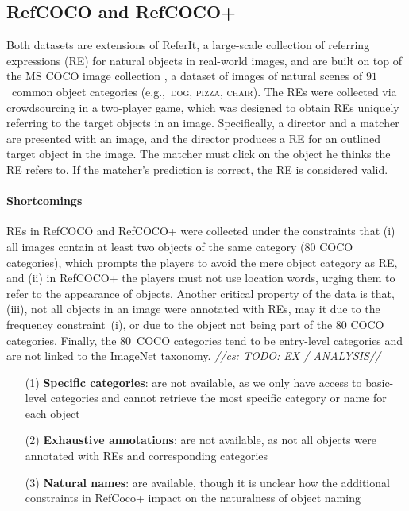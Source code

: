 \documentclass[runningheads]{llncs}
\newcommand{\cs}[1]{\textcolor{PineGreen}{\emph{//cs: #1//}}}
\newcommand{\referit}{ReferIt\xspace}
\newcommand{\refcoco}{RefCOCO\xspace}
\newcommand{\refcocop}{RefCOCO+\xspace}
\newcommand{\cat}[1]{\textsc{#1}}
\begin{document}

\subsection{\refcoco and \refcocop \cite{Yu2016}}
Both datasets are extensions of \referit\cite{Kazemzadeh2014}, a large-scale collection of referring expressions (RE) for natural objects in real-world images, and are built on top of the MS COCO image collection \cite{mscoco}, 
a dataset of images of natural scenes of $91$~common object categories (e.g.,~\cat{dog, pizza, chair}). 
The REs were collected via crowdsourcing in a two-player game, which was designed to obtain REs uniquely referring to the target objects in an image. 
Specifically, a director and a matcher are presented with an image, and the director produces a RE for an outlined target object in the image. 
The matcher must click on the object he thinks the RE refers to. %
If the matcher's prediction is correct, the RE is considered valid.


\paragraph{Shortcomings}
REs in \refcoco and \refcocop were collected under the constraints that (i) all images contain at least two objects of the same category (80 COCO categories), which prompts the players to avoid the mere object category as RE, and (ii) in \refcocop the players must not use location words, urging them to refer to the appearance of objects. 
Another critical property of the data is that, (iii), not all objects in an image were annotated with REs, may it due to the frequency constraint~(i), or due to the object not being part of the 80 COCO categories. 
Finally, the $80$~COCO categories tend to be entry-level categories and are not linked to the ImageNet taxonomy. \cs{TODO: EX / ANALYSIS}

\begin{itemize}
     		\item[(1)] \textbf{Specific categories}: are not available, as we only have access to basic-level categories and cannot retrieve the  most specific category or name for each object
		\item[(2)] \textbf{Exhaustive annotations}: are not available, as not all objects were annotated with REs and corresponding categories
		   \item[(3)] \textbf{Natural names}: are available, though it is unclear how the additional constraints in RefCoco+ impact on the naturalness of object naming

\end{itemize}
\end{document}
